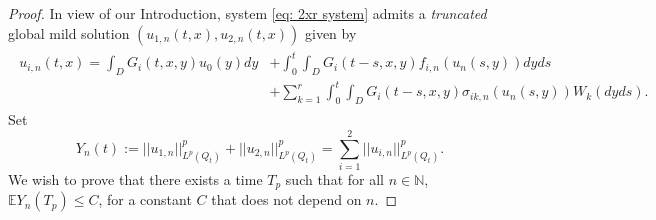 \documentclass[12pt]{article}
\theoremstyle{definition}
\theoremstyle{remark}
\begin{document}
\begin{proof}
    In view of our Introduction, system \eqref{eq: 2xr system} admits a \textit{truncated} global mild solution $(u_{1,n}(t,x),u_{2,n}(t,x))$ given by
\begin{align*}
\begin{split}
    u_{i,n}(t,x) = \int_D G_i(t,x,y)u_0(y)dy &+ \int_0^t\int_D G_i(t-s,x,y)f_{i,n}(u_n(s,y))dyds\\
    &+\sum_{k=1}^r\int_0^t\int_D G_i(t-s,x,y)\sigma_{ik,n}(u_n(s,y))W_k(dyds).
\end{split}
\end{align*}
Set
\begin{equation}\label{eq: Y_n(t) definition}
Y_n(t) := ||u_{1,n}||_{L^p(Q_t)}^p+||u_{2,n}||_{L^p(Q_t)}^p = \sum_{i=1}^2 ||u_{i,n}||_{L^p(Q_t)}^p.\end{equation}
We wish to prove that there exists a time $T_p$ such that for all $n\in \mathbb N$, $\mathbb EY_n(T_p)\leq C$, for a constant $C$ that does not depend on $n$.


\end{proof}
\end{document}
